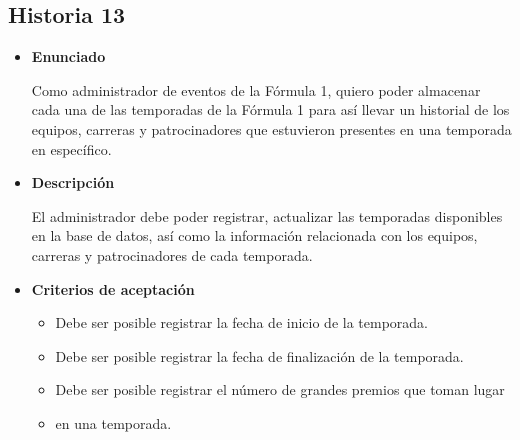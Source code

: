 \documentclass{article}
\begin{document}
	\subsection{Historia 13}
	\begin{itemize}
		
		\item \large{\textbf{Enunciado}}
		\begin{description}
			Como administrador de eventos de la Fórmula 1, quiero poder almacenar cada una de las temporadas de la Fórmula 1 para así llevar un historial de los equipos, carreras y patrocinadores que estuvieron presentes en una temporada en específico.
			
		\end{description}
		
		\item \large{\textbf{Descripción}}
		\begin{description}
			El administrador debe poder registrar, actualizar las temporadas disponibles en la base de datos, así como la información relacionada con los equipos, carreras y patrocinadores de cada temporada.
			
		\end{description}
		
		\item \large{\textbf{Criterios de aceptación}}
		\begin{itemize}
			\item Debe ser posible registrar la fecha de inicio de la temporada.
			\item Debe ser posible registrar la fecha de finalización de la temporada.
			\item Debe ser posible registrar el número de grandes premios que toman lugar \item en una temporada.
			
		\end{itemize}
		
	\end{itemize}
	
\end{document}
